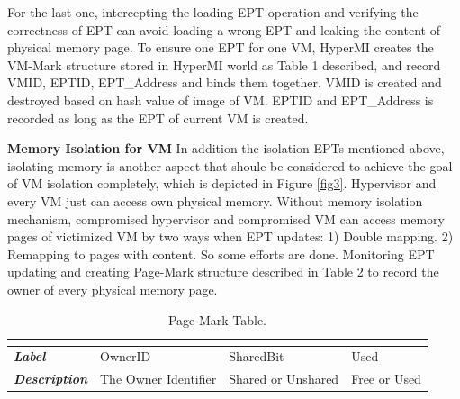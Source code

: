 \documentclass[conference]{IEEEtran}
\begin{document}
For the last one, intercepting the loading EPT operation and verifying the correctness of EPT can avoid loading a wrong EPT and leaking the content of physical memory page. To ensure one EPT for one VM, HyperMI creates the VM-Mark structure stored in HyperMI world as Table 1 described, and record VMID, EPTID, EPT\_Address and binds them together. VMID is created and destroyed based on hash value of image of VM. EPTID and EPT\_Address is recorded as long as the EPT of current VM is created.

\textbf{Memory Isolation for VM }
In addition the isolation EPTs mentioned above, isolating memory is another aspect that shoule be considered to achieve the goal of VM isolation completely, which is depicted in Figure \ref{fig3}. 
Hypervisor and every VM just can access own physical memory. Without memory isolation mechanism, compromised hypervisor and compromised VM can access memory pages of victimized VM by two ways when EPT updates: 1) Double mapping. 2) Remapping to pages with content. So some efforts are done. Monitoring EPT updating and creating Page-Mark structure described in Table 2 to record the owner of every physical memory page. 

\begin{table}
\centering
\caption{Page-Mark Table.}\label{tab2}
\begin{tabular}{p{1.2cm}|p{1.4cm}|p{1.2cm}|p{1.5cm}}
\hline
\multicolumn{4}{c}{\bfseries\textbf\centering{Page-Mark Table}}\\
\hline
{\itshape\bfseries Label} & OwnerID & SharedBit & Used \\
\hline
{\itshape\bfseries Description} & The Owner Identifier & Shared or Unshared & Free or Used \\
\hline
\end{tabular}
\end{table}
\end{document}
